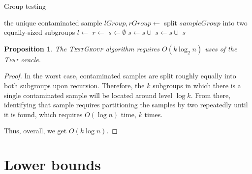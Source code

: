 \documentclass{article}
\newtheorem{proposition}{Proposition}
\begin{document}
\begin{algorithm}[H]
    \caption{Group testing}
    \begin{algorithmic}
                \Return the unique contaminated sample
            \EndIf
            \State $lGroup, rGroup \gets$ split $sampleGroup$ into two equally-sized subgroups
            \State $l \gets$ 
            \State $r \gets$ 
            \State $s \gets \emptyset$
                \State $s \gets s \cup$ 
            \EndIf
                \State $s \gets s \cup$ 
            \EndIf
            \State \Return $s$
        \EndFunction
    \end{algorithmic}
\end{algorithm}

\begin{proposition}
    The \textsc{TestGroup} algorithm requires $O(k\log_2{n})$ uses of the \textsc{Test} oracle.
\end{proposition}

\begin{proof}
    In the worst case, contaminated samples are split roughly equally into both
    subgroups upon recursion. Therefore, the $k$ subgroups in which there is a
    single contaminated sample will be located around level $\log k$. From
    there, identifying that sample requires partitioning the samples by two
    repeatedly until it is found, which requires $O(\log n)$ time, $k$ times.

    Thus, overall, we get $O(k \log n)$.
\end{proof}

\section{Lower bounds}
\end{document}
